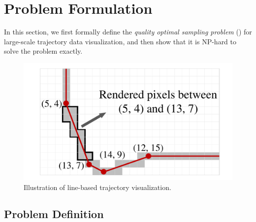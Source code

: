 \section{Problem Formulation}\label{sec:pro}
In this section,
we first formally define the \textit{quality optimal sampling problem} (\prob{}) for large-scale trajectory data visualization,
and then show that it is NP-hard to solve the problem exactly.

\begin{figure}
	\centering
	\small
	\includegraphics[width=0.5\columnwidth]{pictures/problemsolveing/RenderedPixels}  
    \trim
	\caption{Illustration of line-based trajectory visualization.} \label{fig:line}
    \trim \trim
\end{figure}

\subsection{Problem Definition}\label{sec:def}


